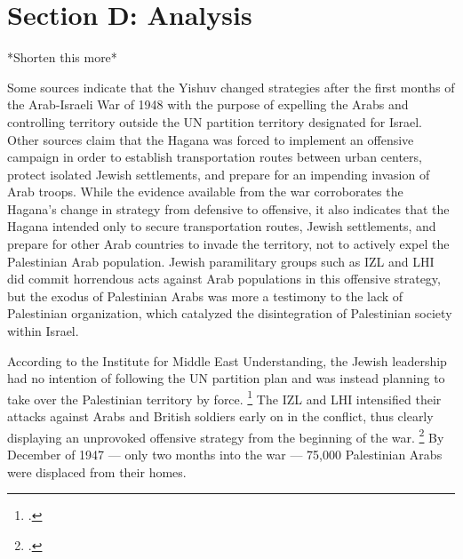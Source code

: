 \documentclass[11pt]{turabian-researchpaper}
\begin{document}

\section{Section D: Analysis}

*Shorten this more*

Some sources indicate that the Yishuv changed strategies after the first months of the Arab-Israeli War of 1948 with the purpose of expelling the Arabs and controlling territory outside the UN partition territory designated for Israel.  Other sources claim that the Hagana was forced to implement an offensive campaign in order to establish transportation routes between urban centers, protect isolated Jewish settlements, and prepare for an impending invasion of Arab troops.
While the evidence available from the war corroborates the Hagana's change in strategy from defensive to offensive, it also indicates that the Hagana intended only to secure transportation routes, Jewish settlements, and prepare for other Arab countries to invade the territory, not to actively expel the Palestinian Arab population.  Jewish paramilitary groups such as IZL and LHI did commit horrendous acts against Arab populations in this offensive strategy, but the exodus of Palestinian Arabs was more a testimony to the lack of Palestinian organization, which catalyzed the disintegration of Palestinian society within Israel.


According to the Institute for Middle East Understanding, the Jewish leadership had no intention of following the UN partition plan and was instead planning to take over the Palestinian territory by force.
\footcite{nabka}
The IZL and LHI intensified their attacks against Arabs and British soldiers early on in the conflict, thus clearly displaying an unprovoked offensive strategy from the beginning of the war.
\footcite{nabka}
By December of 1947 --- only two months into the war --- 75,000 Palestinian Arabs were displaced from their homes.
\end{document}
